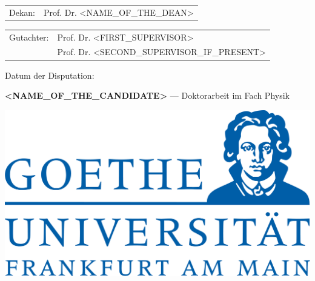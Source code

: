 \documentclass{cd-cover}
\begin{document}
\begin{bookletsheets}
        \noindent{}%
        \begin{tabular}{@{}l@{\hskip 1ex}l}
        Dekan: & Prof. Dr. <NAME_OF_THE_DEAN>
        \end{tabular}

        \vspace*{2mm}

        \noindent{}%
        \begin{tabular}{@{}l@{\hskip 1ex}l}
        Gutachter: & Prof. Dr. <FIRST_SUPERVISOR>\\
                   & Prof. Dr. <SECOND_SUPERVISOR_IF_PRESENT>
        \end{tabular}

        \vspace*{2cm}
        \noindent{}%
        Datum der Disputation:
    \end{bookletsheets}
    
    \begin{backsheet*}{\hspace{16.8mm}\textsc{\textbf{<NAME_OF_THE_CANDIDATE>}} --- \textsf{Doktorarbeit im Fach Physik}}
        \vspace*{0.2\textheight}
        \begin{center}
            \includegraphics[scale=0.1]{Logo}
        \end{center}
    \end{backsheet*}

    
    
\end{document}
